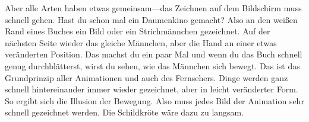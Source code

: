 Aber alle Arten haben etwas gemeinsam---das Zeichnen auf dem Bildschirm muss schnell gehen. Hast du schon mal ein Daumenkino gemacht? Also an den weißen Rand eines Buches ein Bild oder ein Strichmännchen gezeichnet. Auf der nächsten Seite wieder das gleiche Männchen, aber die Hand an einer etwas veränderten Position. Das machst du ein paar Mal und wenn du das Buch schnell genug durchblätterst, wirst du sehen, wie das Männchen sich bewegt. Das ist das Grundprinzip aller Animationen und auch des Fernsehers. Dinge werden ganz schnell hintereinander immer wieder gezeichnet, aber in leicht veränderter Form. So ergibt sich die Illusion der Bewegung. Also muss jedes Bild der Animation sehr schnell gezeichnet werden. Die Schildkröte wäre dazu zu langsam.
\par


